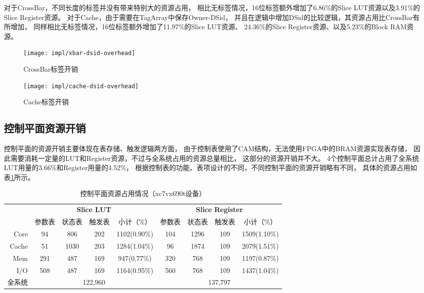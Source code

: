 对于CrossBar，不同长度的标签并没有带来特别大的资源占用，
相比无标签情况，16位标签额外增加了6.86\%的Slice LUT资源以及3.91\%的Slice Register资源。
对于Cache，由于需要在TagArray中保存Owner-DSid，
并且在逻辑中增加DSid的比较逻辑，其资源占用比CrossBar有所增加，
同样相比无标签情况，16位标签额外增加了11.97\%的Slice LUT资源、
24.36\%的Slice Register资源、以及5.23\%的Block RAM资源。

\begin{figure}[tb]
\begin{minipage}{0.48\textwidth}
  \centering
  \texttt{[image: impl/xbar-dsid-overhead]}
  \caption{CrossBar标签开销}
  \label{fig:xbar-dsid-overhead}
\end{minipage}\hfill
\begin{minipage}{0.48\textwidth}
  \centering
  \texttt{[image: impl/cache-dsid-overhead]}
  \caption{Cache标签开销}
  \label{fig:cache-dsid-overhead}
\end{minipage}
\end{figure}


\subsection{控制平面资源开销}

控制平面的资源开销主要体现在表存储、触发逻辑两方面，
由于控制表使用了CAM结构，无法使用FPGA中的BRAM资源实现表存储，
因此需要消耗一定量的LUT和Register资源，不过与全系统占用的资源总量相比，
这部分的资源开销并不大。
4个控制平面总计占用了全系统LUT用量的3.66\%和Register用量的4.52\%，
根据控制表的功能、表项设计的不同，不同控制平面的资源开销略有不同，
具体的资源占用如表\ref{tab:pard-cp-resource}所示。

\begin{table}[htb]
  \centering
  \caption{控制平面资源占用情况（xc7vx690t设备）}
  \label{tab:pard-cp-resource}
  \begin{tabular*}{\linewidth}{rcccccccc}
    \toprule[1.5pt]
          & \multicolumn{4}{c}{\textbf{Slice LUT}}  & \multicolumn{4}{c}{\textbf{Slice Register}} \\
          & 参数表 & 状态表 & 触发表 & 小计（\%）   & 参数表 & 状态表 & 触发表 & 小计（\%）       \\
    \midrule[1pt]
     Core &     94 &    806 &    202 & 1102(0.90\%) &    104 &   1296 &    109 & 1509(1.10\%)      \\
    Cache &     51 &   1030 &    203 & 1284(1.04\%) &     96 &   1874 &    109 & 2079(1.51\%)      \\
      Mem &    291 &    487 &    169 &  947(0.77\%) &    320 &    768 &    109 & 1197(0.87\%)      \\
      I/O &    508 &    487 &    169 & 1164(0.95\%) &    560 &    768 &    109 & 1437(1.04\%)      \\
    \hline
   全系统 & \multicolumn{4}{c}{122,960}             & \multicolumn{4}{c}{137,797}                  \\
    \bottomrule[1.5pt]
  \end{tabular*}\\[2pt]
\end{table}

